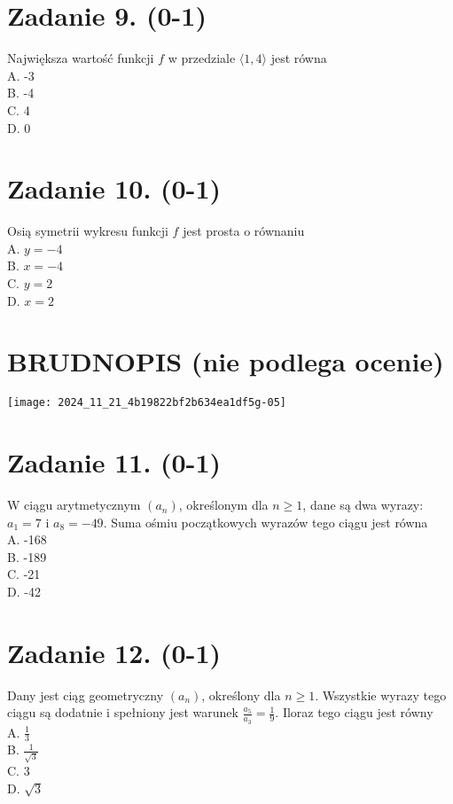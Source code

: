 \documentclass[10pt]{article}
\begin{document}
\section*{Zadanie 9. (0-1)}
Największa wartość funkcji \(f\) w przedziale \(\langle 1,4\rangle\) jest równa\\
A. -3\\
B. -4\\
C. 4\\
D. 0

\section*{Zadanie 10. (0-1)}
Osią symetrii wykresu funkcji \(f\) jest prosta o równaniu\\
A. \(y=-4\)\\
B. \(x=-4\)\\
C. \(y=2\)\\
D. \(x=2\)

\section*{BRUDNOPIS (nie podlega ocenie)}
\begin{center}
\texttt{[image: 2024\_11\_21\_4b19822bf2b634ea1df5g-05]}
\end{center}

\section*{Zadanie 11. (0-1)}
W ciągu arytmetycznym \(\left(a_{n}\right)\), określonym dla \(n \geq 1\), dane są dwa wyrazy: \(a_{1}=7\) i \(a_{8}=-49\). Suma ośmiu początkowych wyrazów tego ciągu jest równa\\
A. -168\\
B. -189\\
C. -21\\
D. -42

\section*{Zadanie 12. (0-1)}
Dany jest ciąg geometryczny \(\left(a_{n}\right)\), określony dla \(n \geq 1\). Wszystkie wyrazy tego ciągu są dodatnie i spełniony jest warunek \(\frac{a_{5}}{a_{3}}=\frac{1}{9}\). Iloraz tego ciągu jest równy\\
A. \(\frac{1}{3}\)\\
B. \(\frac{1}{\sqrt{3}}\)\\
C. 3\\
D. \(\sqrt{3}\)
\end{document}

